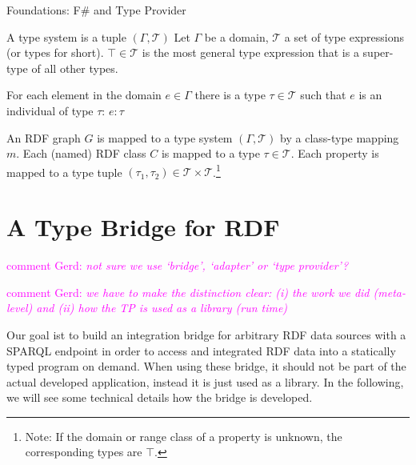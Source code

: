 \documentclass{llncs} %
\newcommand{\ggr}[1]{\textcolor{magenta}{comment Gerd: \textit{#1}}}
\newcommand{\fs}{\textsf{F\#}\xspace}
\begin{document}

Foundations: \fs and Type Provider

\begin{definition}
\label{def:type}
A type system is a tuple $(\Gamma, \mathcal{T})$
Let $\Gamma$ be a domain,  $\mathcal{T}$ a set of type expressions (or types for short).
$\top \in \mathcal{T}$ is the most general type expression that is a super-type of all other types.

For each element in the domain $e \in \Gamma$ there is a type $\tau \in \mathcal{T}$ such
that $e$ is an individual of type $\tau$: $e: \tau$
\end{definition}


\begin{definition}
\label{def:map}
An RDF graph $G$ is mapped to a type system $(\Gamma, \mathcal{T})$ by a class-type mapping $m$.
Each (named) RDF class $C$ is mapped to a type $\tau \in \mathcal{T}$. Each
property is mapped to a type tuple $(\tau_1, \tau_2) \in \mathcal{T} \times \mathcal{T}$.\footnote{Note: If
the domain or range class of a property is unknown, the corresponding types are $\top$.}
\end{definition}


\section{A Type Bridge for RDF}  
\label{sec:design}

\ggr{not sure we use `bridge', `adapter' or `type provider'?}

\ggr{we have to make the distinction clear: (i) the work we did (meta-level) and (ii) how the TP is used as a library (run time)}

Our goal ist to build an integration bridge for arbitrary RDF data sources with a SPARQL endpoint
in order to access and integrated RDF data into a statically typed program on demand.
When using these bridge, it should not be part of the actual developed application,
instead it is just used as a library. In the following, we will see some technical details how
the bridge is developed.
\end{document}
